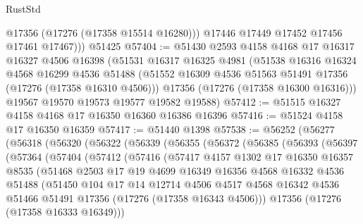 \begin{lexlean}{RustStd}
\begin{coremodule}
            @17356
            (@17276 (@17358 @15514 @16280)))
          @17446
          @17449
          @17452
          @17456
          @17461
          @17467)))
    @51425
@57404 := @51430
    @2593
    @4158
    @4168
    @17
    @16317
    @16327
    @4506
    @16398
    (@51531
      @16317
      @16325
      @4981
      (@51538
        @16316
        @16324
        @4568
        @16299
        @4536
        @51488
        (@51552 @16309 @4536 @51563 @51491 @17356 (@17276 (@17358 @16310 @4506)))
        @17356
        (@17276 (@17358 @16300 @16316)))
      @19567
      @19570
      @19573
      @19577
      @19582
      @19588)
@57412 := @51515 @16327 @4158 @4168 @17 @16350 @16360 @16386 @16396
@57416 := @51524 @4158 @17 @16350 @16359
@57417 := @51440 @1398
@57538 := @56252
    (@56277
      (@56318
        (@56320
          (@56322
            (@56339
              (@56355
                (@56372
                  (@56385
                    (@56393
                      (@56397
                        (@57364
                          (@57404
                            (@57412
                              (@57416
                                (@57417
                                  @4157
                                  @1302
                                  @17
                                  @16350
                                  @16357
                                  @8535
                                  (@51468
                                    @2503
                                    @17
                                    @19
                                    @4699
                                    @16349
                                    @16356
                                    @4568
                                    @16332
                                    @4536
                                    @51488
                                    (@51450
                                      @104
                                      @17
                                      @14
                                      @12714
                                      @4506
                                      @4517
                                      @4568
                                      @16342
                                      @4536
                                      @51466
                                      @51491
                                      @17356
                                      (@17276 (@17358 @16343 @4506)))
                                    @17356
                                    (@17276 (@17358 @16333 @16349)))

\end{coremodule}
\end{lexlean}
